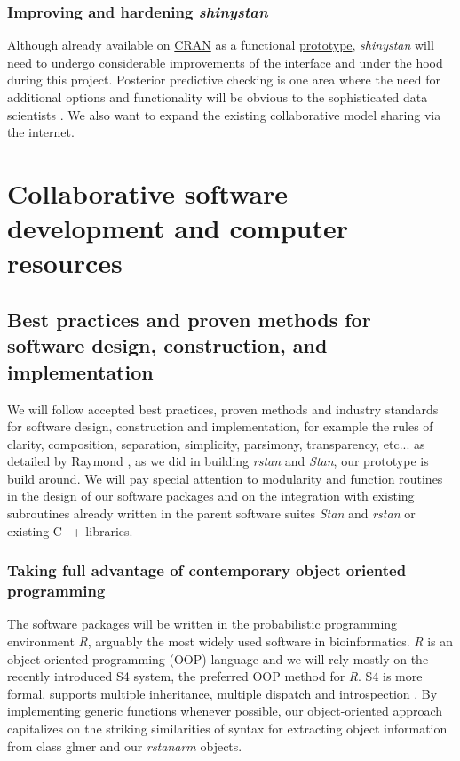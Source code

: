 \documentclass[11pt,notitlepage]{article}
\begin{document}
\subsubsection*{Improving and hardening \textit{shinystan}}
Although already available on 
\href{https://cran.r-project.org/web/packages/shinystan/index.html}{CRAN} 
as a functional \href{https://www.youtube.com/watch?v=X31xqNHcvQs}{prototype},
\textit{shinystan} will need to undergo considerable improvements of the 
interface and under the hood during this project. Posterior predictive 
checking is one area where the need for additional options and functionality 
will be obvious to the sophisticated data scientists \cite{shinystan}. 
We also want to expand the existing collaborative model sharing via the internet.

\section*{Collaborative software development and computer resources}
\subsection*{Best practices and proven methods for software design, construction, and implementation}
We will follow accepted best practices, proven methods and industry standards for software design, construction and implementation, for example the rules of clarity, composition, separation, simplicity, parsimony, transparency, etc... as detailed by Raymond \cite{Raymond2003art}, as we did in building \textit{rstan} and \textit{Stan}, our  prototype is build around. We will pay special attention to modularity and function routines in the design of our software packages and on the integration with existing subroutines already written in the parent software suites \textit{Stan} and \textit{rstan} or existing C++ libraries. 

\subsubsection*{Taking full advantage of contemporary object oriented programming}
The software packages will be written in the probabilistic programming environment \textit{R}, arguably the most widely used software in bioinformatics. \textit{R} is an object-oriented programming (OOP) language and we will rely mostly on the recently introduced S4 system, the preferred OOP method for \textit{R}. S4 is more formal, supports multiple inheritance, multiple dispatch and introspection \cite{Chambers2014object}. By implementing generic functions whenever possible, our object-oriented approach capitalizes on the striking similarities of syntax for extracting object information from class glmer and our \textit{rstanarm} objects. 
\end{document}

